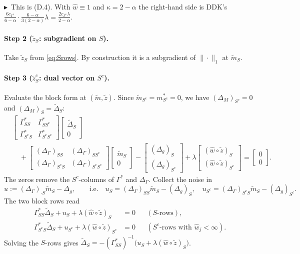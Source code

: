 \documentclass[11pt,a4paper]{article}
\numberwithin{equation}{section}
\theoremstyle{plain}
\theoremstyle{remark}
\newcommand{\changed}{$\blacktriangleright$\ }
\begin{document}
\changed This is (D.4). With $\hat w\equiv1$ and $\kappa=2-\alpha$ the right-hand side is DDK's $\frac{6c_{\Gamma^*}}{6-\alpha}\cdot\frac{6-\alpha}{3(2-\alpha)}\lambda=\frac{2c_{\Gamma^*}\lambda}{2-\alpha}$.

\paragraph{Step 2 ($\tilde{z}_S$: subgradient on $S$).} Take $\tilde z_S$ from \eqref{eq:Srows}. By construction it is a subgradient of $\|\cdot\|_1$ at $\tilde m_S$.

\paragraph{Step 3 ($\tilde{z}_S^c$: dual vector on $S^c$).} Evaluate the block form at $(\tilde m,\tilde z)$. Since $\tilde m_{S^c}=m^*_{S^c}=0$, we have $(\Delta_M)_{S^c}=0$ and $(\Delta_M)_S=\tilde\Delta_S$:
\begin{align*}
&\begin{bmatrix}\Gamma^*_{SS}&\Gamma^*_{SS^c}\\\Gamma^*_{S^cS}&\Gamma^*_{S^cS^c}\end{bmatrix}
\begin{bmatrix}\tilde\Delta_S\\0\end{bmatrix}\\
&\quad+\begin{bmatrix}(\Delta_\Gamma)_{SS}&(\Delta_\Gamma)_{SS^c}\\(\Delta_\Gamma)_{S^cS}&(\Delta_\Gamma)_{S^cS^c}\end{bmatrix}
\begin{bmatrix}\tilde m_S\\0\end{bmatrix}
-\begin{bmatrix}(\Delta_g)_S\\(\Delta_g)_{S^c}\end{bmatrix}
+\lambda\begin{bmatrix}(\hat w\circ\tilde z)_S\\(\hat w\circ\tilde z)_{S^c}\end{bmatrix}
=\begin{bmatrix}0\\0\end{bmatrix}.
\end{align*}
The zeros remove the $S^c$-columns of $\Gamma^*$ and $\Delta_\Gamma$. Collect the noise in
\[
u:=(\Delta_\Gamma)_{\cdot S}\tilde m_S-\Delta_g,\qquad\text{i.e.}\quad u_S=(\Delta_\Gamma)_{SS}\tilde m_S-(\Delta_g)_S,\quad u_{S^c}=(\Delta_\Gamma)_{S^cS}\tilde m_S-(\Delta_g)_{S^c}.
\]
The two block rows read
\begin{align*}
\Gamma^*_{SS}\tilde\Delta_S+u_S+\lambda(\hat w\circ\tilde z)_S&=0 && (S\text{-rows}),\\
\Gamma^*_{S^cS}\tilde\Delta_S+u_{S^c}+\lambda(\hat w\circ\tilde z)_{S^c}&=0 && (S^c\text{-rows with }\hat w_j<\infty).
\end{align*}
Solving the $S$-rows gives $\tilde\Delta_S=-(\Gamma^*_{SS})^{-1}\big(u_S+\lambda(\hat w\circ\tilde z)_S\big)$. 
\end{document}

